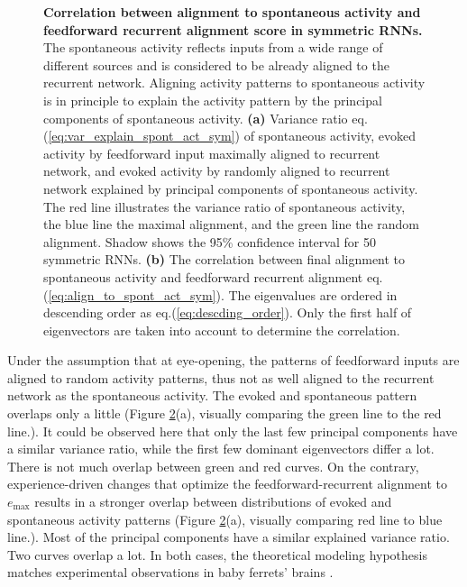 \documentclass[11pt]{article}
\begin{document}
\begin{figure}[H]
\begin{subfigure}[b]{0.45\textwidth}
				\caption{}
				\label{fig:align_spont_sym}
			\end{subfigure}
			\caption{\textbf{Correlation between alignment to spontaneous activity and feedforward recurrent alignment score in symmetric RNNs.} The spontaneous activity reflects inputs from a wide range of different sources and is considered to be already aligned to the recurrent network\cite{tragenap2023nature}. Aligning activity patterns to spontaneous activity is in principle to explain the activity pattern by the principal components of spontaneous activity. \textbf{(a)} Variance ratio eq.(\ref{eq:var_explain_spont_act_sym}) of spontaneous activity, evoked activity by feedforward input maximally aligned to recurrent network, and evoked activity by randomly aligned to recurrent network explained by principal components of spontaneous activity. The red line illustrates the variance ratio of spontaneous activity, the blue line the maximal alignment, and the green line the random alignment. Shadow shows the 95\% confidence interval for 50 symmetric RNNs. \textbf{(b)} The correlation between final alignment to spontaneous activity and feedforward recurrent alignment eq.(\ref{eq:align_to_spont_act_sym}). The eigenvalues are ordered in descending order as eq.(\ref{eq:descding_order}). Only the first half of eigenvectors are taken into account to determine the correlation.}
			\label{fig:align_spont_act_sym}
		\end{figure}
	
	Under the assumption that at eye-opening, the patterns of feedforward inputs are aligned to random activity patterns, thus not as well aligned to the recurrent network as the spontaneous activity. The evoked and spontaneous pattern overlaps only a little (Figure \ref{fig:align_spont_act_sym}(a), visually comparing the green line to the red line.). It could be observed here that only the last few principal components have a similar variance ratio, while the first few dominant eigenvectors differ a lot. There is not much overlap between green and red curves. On the contrary, experience-driven changes that optimize the feedforward-recurrent alignment to $e_{\text{max}}$ results in a stronger overlap between distributions of evoked and spontaneous activity patterns (Figure \ref{fig:align_spont_act_sym}(a), visually comparing red line to blue line.). Most of the principal components have a similar explained variance ratio. Two curves overlap a lot. In both cases, the theoretical modeling hypothesis matches experimental observations in baby ferrets' brains \cite{tragenap2023nature}.
	
\end{document}
